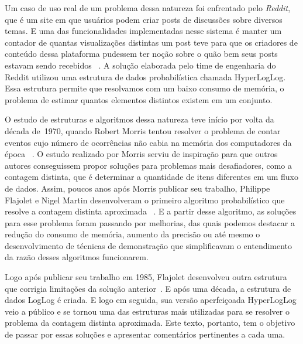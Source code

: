 Um caso de uso real de um problema dessa natureza foi enfrentado pelo \textit{Reddit}, que é um site em que usuários 
podem criar posts de discussões sobre diversos temas. E uma das funcionalidades implementadas nesse sistema é manter um 
contador de quantas visualizações distintas um post teve para que os criadores de conteúdo dessa plataforma pudessem ter 
noção sobre o quão bem seus posts estavam sendo recebidos ~\citep{Reddit}. A solução elaborada pelo time de engenharia 
do Reddit utilizou uma estrutura de dados probabilística chamada HyperLogLog. Essa estrutura permite que resolvamos com 
um baixo consumo de memória, o problema de estimar quantos elementos distintos existem em um conjunto.

O estudo de estruturas e algoritmos dessa natureza teve início por volta da década de~1970, quando Robert Morris tentou
resolver o problema de contar eventos cujo número de ocorrências não cabia na memória dos computadores da época 
~\citep{morris:78}. O estudo realizado por Morris serviu de inspiração para que outros autores conseguissem propor 
soluções para problemas mais desafiadores, como a contagem distinta, que é determinar a quantidade de itens diferentes
em um fluxo de dados. Assim, poucos anos após Morris publicar seu trabalho, Philippe Flajolet e Nigel Martin 
desenvolveram o primeiro algoritmo probabilístico que resolve a contagem distinta aproximada 
~\citep{flajolet:martin:85}. E a partir desse algoritmo, as soluções para esse problema foram passando por melhorias, 
das quais podemos destacar a redução do consumo de memória, aumento da precisão ou até mesmo o desenvolvimento de 
técnicas de demonstração que simplificavam o entendimento da razão desses algoritmos funcionarem.

Logo após publicar seu trabalho em 1985, Flajolet desenvolveu outra estrutura que corrigia limitações da solução 
anterior~\citep{adptive:sampling:90}. E após uma década, a estrutura de dados LogLog é criada. E logo em seguida, sua 
versão aperfeiçoada HyperLogLog veio a público e se tornou uma das estruturas mais utilizadas para se resolver o 
problema da contagem distinta aproximada. Este texto, portanto, tem o objetivo de passar por essas soluções e apresentar 
comentários pertinentes a cada uma.
